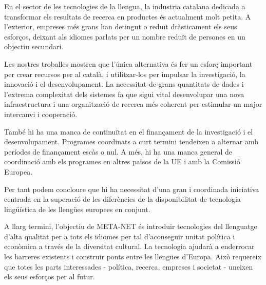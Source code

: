 \documentclass[]{../../metanetpaper}
\begin{document}
\begin{multicols}{2}
En el sector de les tecnologies de la llengua, la industria catalana dedicada a transformar els resultats de recerca en productes és actualment molt petita. A l'exterior, empreses més grans han detingut o reduït dràsticament els seus esforços, deixant als idiomes parlats per un nombre reduït de persones en un objectiu secundari.

Les nostres troballes mostren que l'única alternativa és fer un esforç important per crear recursos per al català, i utilitzar-los per impulsar la investigació, la innovació i el desenvolupament. La necessitat de grans quantitats de dades i l'extrema complexitat dels sistemes fa que sigui vital desenvolupar una nova infraestructura i una organització de recerca més coherent per estimular un major intercanvi i cooperació.

També hi ha una manca de continuïtat en el finançament de la investigació i el desenvolupament. Programes coordinats a curt termini tendeixen a alternar amb períodes de finançament escàs o nul. A més, hi ha una manca general de coordinació amb els programes en altres països de la UE i amb la Comissió Europea.

Per tant podem concloure que hi ha necessitat d'una gran i coordinada iniciativa centrada en la superació de les diferències de la disponibilitat de tecnologia lingüística de les llengües europees en conjunt.


A llarg termini, l’objectiu de META-NET és introduir tecnologies del llenguatge d'alta qualitat per a tots els idiomes per tal d'aconseguir unitat política i econòmica a través de la diversitat cultural. La tecnologia ajudarà a enderrocar les barreres existents i construir ponts entre les llengües d'Europa. Això requereix que totes les parts interessades - política, recerca, empreses i societat - uneixen els seus esforços per al futur.


\end{multicols}

\cleardoublepage


\end{document}
